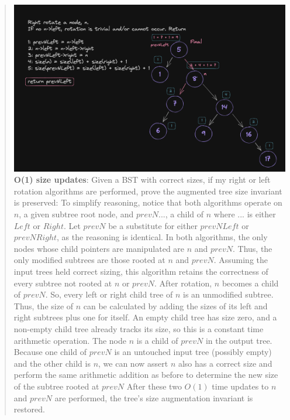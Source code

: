 \documentclass[11pt]{article}
\begin{document}
\begin{enumerate}
\begin{enumerate}
\begin{quote}
           \newline
           \includegraphics[scale=0.3]{right_rotations/rrf.png}         
           \newline
           \newline 
           \textbf{O(1) size updates}: \newline 
          Given a BST with correct sizes, if my right or left rotation algorithms are performed, prove the augmented tree size invariant is preserved: \newline 
          To simplify reasoning, notice that both algorithms operate on $n$, a given subtree root node, and $prevN...$, a child of $n$ where $...$ is either $Left$ or $Right$. Let $prevN$ be a substitute for either $prevNLeft$ or $prevNRight$, as the reasoning is identical. \newline 
          In both algorithms, the only nodes whose child pointers are manipulated are $n$ and $prevN$. Thus, the only modified subtrees are those rooted at $n$ and $prevN$. Assuming the input trees held correct sizing, this algorithm retains the correctness of every subtree not rooted at $n$ or $prevN$.\newline 
          After rotation, $n$ becomes a child of $prevN$. So, every left or right child tree of $n$ is an unmodified subtree. Thus, the size of $n$ can be calculated by adding the sizes of its left and right subtrees plus one for itself. An empty child tree has size zero, and a non-empty child tree already tracks its size, so this is a constant time arithmetic operation. \newline 
          The node $n$ is a child of $prevN$ in the output tree. Because one child of $prevN$ is an untouched input tree (possibly empty) and the other child is $n$, we can now assert $n$ also has a correct size and perform the same arithmetic addition as before to determine the new size of the subtree rooted at $prevN$ \newline
          After these two $O(1)$ time updates to $n$ and $prevN$ are performed, the tree's size augmentation invariant is restored.
        \end{quote}


\end{enumerate}
\end{enumerate}
\end{document}
